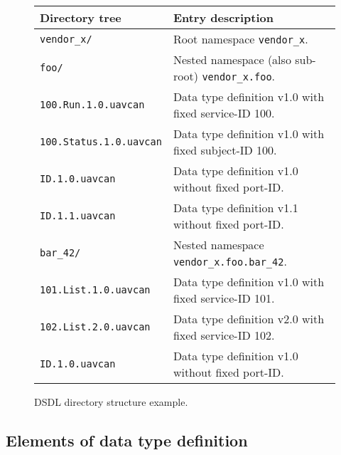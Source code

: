 \begin{figure}[H]
    \begin{tabu}{|l|X|} \hline
        \rowfont{\bfseries}
        Directory tree & Entry description \\\hline

        \texttt{vendor\_x/} &
        Root namespace \texttt{vendor\_x}. \\

        \texttt{\qquad{}foo/} &
        Nested namespace (also sub-root) \texttt{vendor\_x.foo}. \\

        \texttt{\qquad{}\qquad{}100.Run.1.0.uavcan} &
        Data type definition v1.0 with fixed service-ID 100. \\

        \texttt{\qquad{}\qquad{}100.Status.1.0.uavcan} &
        Data type definition v1.0 with fixed subject-ID 100. \\

        \texttt{\qquad{}\qquad{}ID.1.0.uavcan} &
        Data type definition v1.0 without fixed port-ID. \\

        \texttt{\qquad{}\qquad{}ID.1.1.uavcan} &
        Data type definition v1.1 without fixed port-ID. \\

        \texttt{\qquad{}\qquad{}bar\_42/} &
        Nested namespace \texttt{vendor\_x.foo.bar\_42}. \\

        \texttt{\qquad{}\qquad{}\qquad{}101.List.1.0.uavcan} &
        Data type definition v1.0 with fixed service-ID 101. \\

        \texttt{\qquad{}\qquad{}\qquad{}102.List.2.0.uavcan} &
        Data type definition v2.0 with fixed service-ID 102. \\

        \texttt{\qquad{}\qquad{}\qquad{}ID.1.0.uavcan} &
        Data type definition v1.0 without fixed port-ID. \\\hline
    \end{tabu}
    \caption{DSDL directory structure example.}\label{fig:dsdl_directory_structure_example}
\end{figure}

\subsection{Elements of data type definition}

